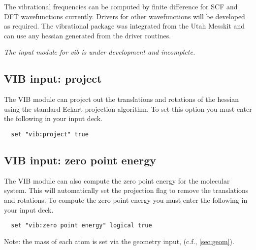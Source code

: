 The vibrational frequencies can be computed by finite difference for
SCF and DFT wavefunctions currently.  Drivers for other wavefunctions
will be developed as required.  The vibrational package was integrated
from the Utah Messkit and can use any hessian generated from the
driver routines.

{\it The input module for vib is under development and incomplete.}

\subsection{VIB input: project}

The VIB module can project out the translations and rotations of the
hessian using the standard Eckart projection algorithm.  To set this
option you must enter the following in your input deck.

\begin{verbatim}
  set "vib:project" true
\end{verbatim}

\subsection{VIB input: zero point energy}

The VIB module can also compute the zero point energy for the
molecular system.  This will automatically set the projection flag to
remove the translations and rotations.   To compute the zero point energy
you must enter the following in your input deck.

\begin{verbatim}
  set "vib:zero point energy" logical true
\end{verbatim}

Note: the mass of each atom is set via the geometry input, (c.f.,
\ref{sec:geom}). 
